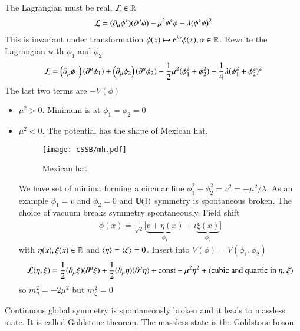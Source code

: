 The Lagrangian must be real, $\mathcal{L} \in \mathbb{R}$
\begin{align}
   \mathcal{L} = ( \partial_\mu \phi^* ) ( \partial^\mu \phi ) - \mu^2 \phi^* \phi - \lambda (\phi^* \phi)^2
\end{align}
This is invariant under transformation $\phi(x) \mapsto \mathrm{e}^{i\alpha} \phi(x), \alpha \in \mathbb{R}$. Rewrite the Lagrangian with $\phi_1$ and $\phi_2$
\begin{align*}
   \mathcal{L} =  \left( \partial_\mu \phi_1 \right) \left( \partial^\mu \phi_1 \right) + \left( \partial_\mu \phi_2 \right) \left( \partial^\mu \phi_2 \right) - \frac{1}{2} \mu^2 (\phi_1^2 + \phi_2^2) - \frac{1}{4} \lambda (\phi_1^2 + \phi_2^2)^2
\end{align*}
The last two terms are $-V(\phi)$

\begin{itemize}
   \item $\mu^2 > 0$. Minimum is at $\phi_1 = \phi_2 = 0$
   \item $\mu^2 < 0$. The potential has the shape of Mexican hat.
   \begin{figure}[htpb]
      \centering
      \texttt{[image: cSSB/mh.pdf]}
      \caption{Mexican hat\cite{wikiSSB}}%
      \label{fig:mexicanHat}
   \end{figure}
      We have set of minima forming a circular line $\phi_1^2 + \phi_2^2 = v^2 = -{\mu^2}/{\lambda}$. As an example $\phi_1 = v$ and $\phi_2 = 0$ and $\mathbf{U}(1)$ symmetry is spontaneous broken. The choice of vacuum breaks symmetry spontaneously.
      Field shift
      \begin{align}
         \phi(x) = \frac{1}{\sqrt{2}} \Big[ \underbrace{v + \eta(x)}_{\phi_1} + i \underbrace{\xi(x)}_{\phi_2} \Big]
      \end{align}
      with $\eta(x), \xi(x) \in \mathbb{R}$ and $\expval{\eta} = \expval{\xi}=0$.
      Insert into $V(\phi) = V(\phi_1, \phi_2)$
      \begin{align}
         \mathcal{L}(\eta, \xi) = \frac{1}{2} (\partial_\mu \xi) (\partial^\mu \xi) + \frac{1}{2} (\partial_\mu \eta) (\partial^\mu \eta) + \text{const} + \mu^2 \eta^2 + (\text{cubic and quartic in $\eta$, $\xi$})
      \end{align}
      so $m_\eta^2 = -2\mu^2$ but $m_\xi^2 = 0$
\end{itemize}
Continuous global symmetry is spontaneously broken and it leads to massless state. It is called \underline{Goldstone theorem}. The massless state is the Goldstone boson.

